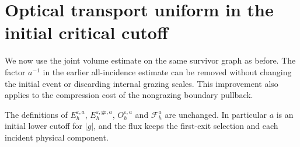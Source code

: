 \section{Optical transport uniform in the initial critical cutoff}
\label{sec:v81-transport}
We now use the joint volume estimate on the same survivor graph as
before. The factor $a^{-1}$ in the earlier all-incidence estimate
can be removed without changing the initial event or discarding
internal grazing scales. This improvement also applies to the
compression cost of the nongrazing boundary pullback.

The definitions of $E_h^{\varepsilon,a}$,
$E_h^{\varepsilon,\mathrm{gr},a}$, $O_h^{\varepsilon,a}$ and
$\mathcal F_h^a$ are unchanged. In particular $a$ is an initial
lower cutoff for $|g|$, and the flux keeps the first-exit selection
and each incident physical component.


